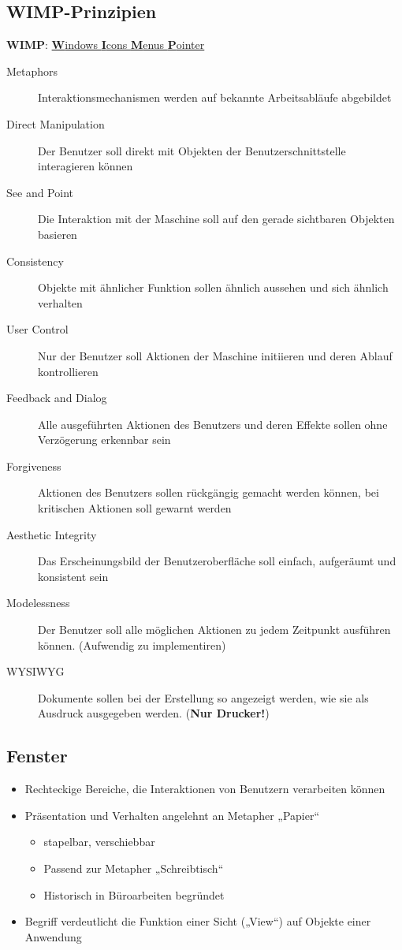 \documentclass[8pt,a4paper,landscape]{extarticle}
\begin{document}
\begin{multicols*}{4}
	\subsection{WIMP-Prinzipien}
	\textbf{WIMP}: \underline{\textbf{W}indows \textbf{I}cons \textbf{M}enus \textbf{P}ointer}
	\begin{description}
		\item[Metaphors] Interaktionsmechanismen werden auf bekannte
		      Arbeitsabläufe abgebildet
		\item[Direct Manipulation] Der Benutzer soll direkt mit Objekten der
		      Benutzerschnittstelle interagieren können
		\item[See and Point] Die Interaktion mit der Maschine soll auf den
		      gerade sichtbaren Objekten basieren
		\item[Consistency] Objekte mit ähnlicher Funktion sollen ähnlich
		      aussehen und sich ähnlich verhalten
		\item [User Control] Nur der Benutzer soll Aktionen der Maschine
		      initiieren und deren Ablauf kontrollieren
		\item [Feedback and Dialog] Alle ausgeführten Aktionen des Benutzers
		      und deren Effekte sollen ohne Verzögerung erkennbar sein
		\item [Forgiveness] Aktionen des Benutzers sollen rückgängig gemacht
		      werden können, bei kritischen Aktionen soll gewarnt werden
		\item [Aesthetic Integrity] Das Erscheinungsbild der Benutzeroberfläche
		      soll einfach, aufgeräumt und konsistent sein
		\item [Modelessness] Der Benutzer soll alle möglichen Aktionen zu jedem
		      Zeitpunkt ausführen können. (Aufwendig zu implementiren)
		\item [WYSIWYG] Dokumente sollen bei der Erstellung so angezeigt werden,
		      wie sie als Ausdruck ausgegeben werden. (\textbf{Nur Drucker!})
	\end{description}
	\subsection{Fenster}
	\begin{itemize}
		\item Rechteckige Bereiche, die Interaktionen von Benutzern verarbeiten
		      können
		\item Präsentation und Verhalten angelehnt an Metapher „Papier“
		      \begin{itemize}[nolistsep]
			      \item stapelbar, verschiebbar
			      \item Passend zur Metapher „Schreibtisch“
			      \item Historisch in Büroarbeiten begründet
		      \end{itemize}
		\item Begriff verdeutlicht die Funktion einer Sicht („View“) auf Objekte
		      einer Anwendung
	\end{itemize}

\end{multicols*}
\end{document}
